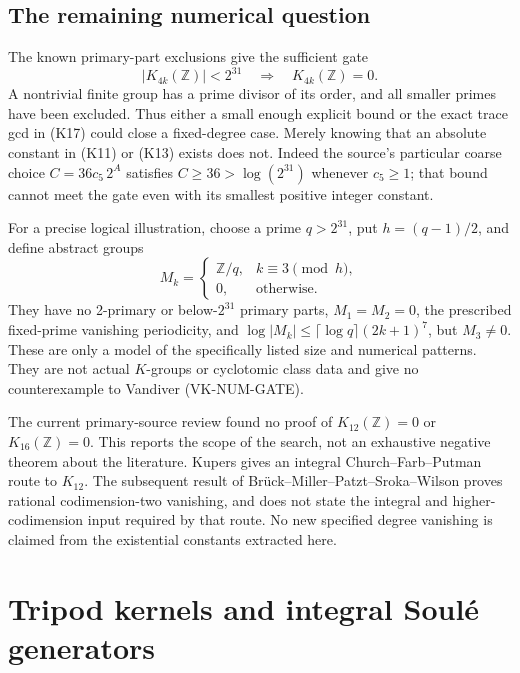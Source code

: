 \documentclass[11pt,a4paper]{article}
\theoremstyle{definition}
\begin{document}
\subsection{The remaining numerical question}

The known primary-part exclusions give the sufficient gate
\[
 |K_{4k}(\mathbb Z)|<2^{31}
 \quad\Longrightarrow\quad K_{4k}(\mathbb Z)=0.       \tag{K22}
\]
A nontrivial finite group has a prime divisor of its order,
and all smaller primes have been excluded. Thus either a
small enough explicit bound or the exact trace gcd in
(K17) could close a fixed-degree case. Merely knowing that
an absolute constant in (K11) or (K13) exists does not.
Indeed the source's particular coarse choice
\(C=36c_5\,2^A\) satisfies \(C\ge36>\log(2^{31})\)
whenever \(c_5\ge1\); that bound cannot meet the gate even
with its smallest positive integer constant.

For a precise logical illustration, choose a prime
\(q>2^{31}\), put \(h=(q-1)/2\), and define abstract groups
\[
 M_k=
 \begin{cases}
 \mathbb Z/q,& k\equiv3\pmod h,\\
 0,&\text{otherwise}.
 \end{cases}
\]
They have no 2-primary or below-\(2^{31}\) primary parts,
\(M_1=M_2=0\), the prescribed fixed-prime vanishing
periodicity, and
\(\log|M_k|\le\lceil\log q\rceil(2k+1)^7\), but
\(M_3\ne0\). These are only a model of the specifically
listed size and numerical patterns. They are not actual
\(K\)-groups or cyclotomic class data and give no
counterexample to Vandiver (VK-NUM-GATE).

The current primary-source review found no proof of
\(K_{12}(\mathbb Z)=0\) or \(K_{16}(\mathbb Z)=0\).
This reports the scope of the search, not an exhaustive
negative theorem about the literature.
Kupers \cite[Remark~2.6, p.~4]{Kupers2019} gives an
integral Church--Farb--Putman route to \(K_{12}\).
The subsequent result of Br\"uck--Miller--Patzt--Sroka--Wilson
\cite[Theorem~B]{BrueckEtAl2024} proves rational
codimension-two vanishing, and does not state the integral
and higher-codimension input required by that route.
No new specified degree vanishing is claimed from the
existential constants extracted here.

\section{Tripod kernels and integral Soul\'e generators}
\label{sec:tripod-integral}
\end{document}
